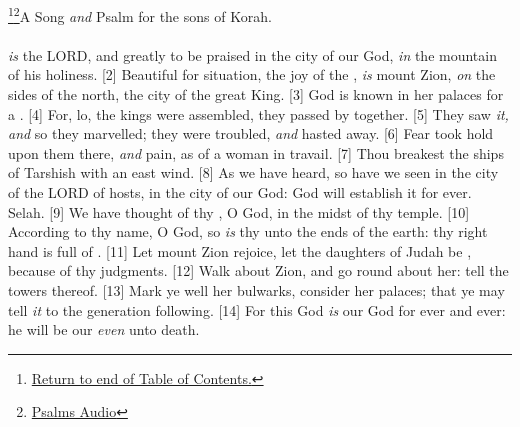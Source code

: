 \footnote{\textcolor[cmyk]{0.99998,1,0,0}{\hyperlink{TOC}{Return to end of Table of Contents.}}}\footnote{\href{https://audiobible.com/bible/psalms_48.html}{\textcolor[cmyk]{0.99998,1,0,0}{Psalms Audio}}}\textcolor[cmyk]{0.99998,1,0,0}{A Song \emph{and} Psalm for the sons of Korah.}\\
\\
\textcolor[cmyk]{0.99998,1,0,0}{ \emph{is} the LORD, and greatly to be praised in the city of our God, \emph{in} the mountain of his holiness.}
[2] \textcolor[cmyk]{0.99998,1,0,0}{Beautiful for situation, the joy of the , \emph{is} mount Zion, \emph{on} the sides of the north, the city of the great King.}
[3] \textcolor[cmyk]{0.99998,1,0,0}{God is known in her palaces for a .}
[4] \textcolor[cmyk]{0.99998,1,0,0}{For, lo, the kings were assembled, they passed by together.}
[5] \textcolor[cmyk]{0.99998,1,0,0}{They saw \emph{it,} \emph{and} so they marvelled; they were troubled, \emph{and} hasted away.}
[6] \textcolor[cmyk]{0.99998,1,0,0}{Fear took hold upon them there, \emph{and} pain, as of a woman in travail.}
[7] \textcolor[cmyk]{0.99998,1,0,0}{Thou breakest the ships of Tarshish with an east wind.}
[8] \textcolor[cmyk]{0.99998,1,0,0}{As we have heard, so have we seen in the city of the LORD of hosts, in the city of our God: God will establish it for ever. Selah.}
[9] \textcolor[cmyk]{0.99998,1,0,0}{We have thought of thy , O God, in the midst of thy temple.}
[10] \textcolor[cmyk]{0.99998,1,0,0}{According to thy name, O God, so \emph{is} thy  unto the ends of the earth: thy right hand is full of .}
[11] \textcolor[cmyk]{0.99998,1,0,0}{Let mount Zion rejoice, let the daughters of Judah be , because of thy judgments.}
[12] \textcolor[cmyk]{0.99998,1,0,0}{Walk about Zion, and go round about her: tell the towers thereof.}
[13] \textcolor[cmyk]{0.99998,1,0,0}{Mark ye well her bulwarks, consider her palaces; that ye may tell \emph{it} to the generation following.}
[14] \textcolor[cmyk]{0.99998,1,0,0}{For this God \emph{is} our God for ever and ever: he will be our  \emph{even} unto death.}
